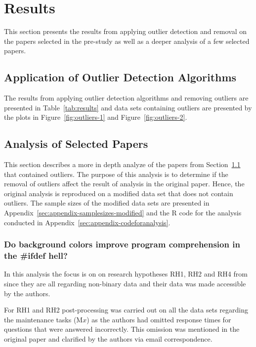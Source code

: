 ﻿\section{Results}
\label{sec:results}
This section presents the results from applying outlier detection and removal on the papers selected in the pre-study as well as a deeper analysis of a few selected papers.


\subsection{Application of Outlier Detection Algorithms}
\label{sec:results-application}
The results from applying outlier detection algorithms and removing outliers are presented in Table~\ref{tab:results} and data sets containing outliers are presented by the plots in Figure~\ref{fig:outliers-1} and Figure~\ref{fig:outliers-2}.








\subsection{Analysis of Selected Papers}
\label{sec:results-papers}
This section describes a more in depth analyze of the papers from Section~\ref{sec:results-application} that contained outliers. The purpose of this analysis is to determine if the removal of outliers affect the result of analysis in the original paper. Hence, the original analysis is reproduced on a modified data set that does not contain outliers. The sample sizes of the modified data sets are presented in Appendix~\ref{sec:appendix-samplesizes-modified} and the \textsf{R} code for the analysis conducted in Appendix~\ref{sec:appendix-codeforanalysis}.




\subsubsection{Do background colors improve program comprehension in the \#ifdef hell?}
In this analysis the focus is on on research hypotheses RH1, RH2 and RH4 from \citep{feigenspan2013background} since they are all regarding non-binary data and their data was made accessible by the authors.




For RH1 and RH2 post-processing was carried out on all the data sets regarding the maintenance tasks (M$x$) as the authors had omitted response times for questions that were answered incorrectly. This omission was mentioned in the original paper and clarified by the authors via email correspondence.




